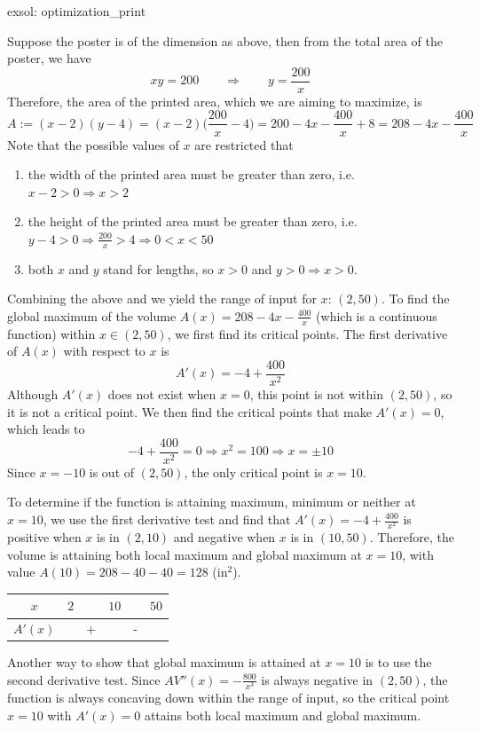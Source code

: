 \begin{exsol}[]{exsol: optimization_print}
    \begin{center}
        \label{fig: ex_optimization_print}
    \end{center}
    Suppose the poster is of the dimension as above, then from the total area of the poster, we have
    \[xy = 200 \qquad \Rightarrow \qquad y = \frac{200}{x}\]
    Therefore, the area of the printed area, which we are aiming to maximize, is
    \[A := (x-2)(y-4) = (x-2)\Big(\frac{200}{x}-4\Big) = 200-4x-\frac{400}{x}+8 = 208 - 4x - \frac{400}{x}\]
    Note that the possible values of $x$ are restricted that
    \begin{enumerate}
        \item the width of the printed area must be greater than zero, i.e. $x-2 > 0 \Rightarrow x > 2$
        \item the height of the printed area must be greater than zero, i.e. $y-4 > 0 \Rightarrow \frac{200}{x}>4 \Rightarrow 0 < x < 50$
        \item both $x$ and $y$ stand for lengths, so $x > 0$ and $y > 0 \Rightarrow x > 0$.  
    \end{enumerate}
    
    Combining the above and we yield the range of input for $x$: $(2, 50)$.  To find the global maximum of the volume $A(x) = 208-4x-\frac{400}{x}$ (which is a continuous function) within $x \in (2, 50)$, we first find its critical points.  The first derivative of $A(x)$ with respect to $x$ is 
    \[A'(x) = -4 + \frac{400}{x^2}\]
    Although $A'(x)$ does not exist when $x=0$, this point is not within $(2, 50)$, so it is not a critical point.  We then find the critical points that make $A'(x) = 0$, which leads to
    \[-4 +\frac{400}{x^2} = 0 \Rightarrow x^2 = 100 \Rightarrow x = \pm 10\]
    Since $x = -10$ is out of $(2, 50)$, the only critical point is $x = 10$.
    
    To determine if the function is attaining maximum, minimum or neither at $x = 10$, we use the first derivative test and find that $A'(x) = -4 + \frac{400}{x^2}$ is positive when $x$ is in $(2, 10)$ and negative when $x$ is in $(10, 50)$.  Therefore, the volume is attaining both local maximum and global maximum at $x = 10$, with value $A(10) = 208-40-40 = 128$ (in$^2$).
    \begin{center}
        \begin{tabular}{cccccc}
            $x$    & $2$ &   & $10$ &   & $50$  \\
            \hline
            $A'(x)$ &     & + &      & - & 
        \end{tabular}
    \end{center}
    Another way to show that global maximum is attained at $x = 10$ is to use the second derivative test.  Since $AV''(x) = -\frac{800}{x^3}$ is always negative in $(2, 50)$, the function is always concaving down within the range of input, so the critical point $x = 10$ with $A'(x) = 0$ attains both local maximum and global maximum.
\end{exsol}

